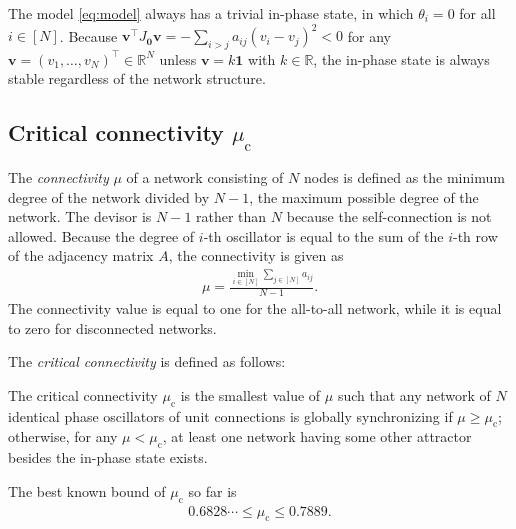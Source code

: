 The model \eqref{eq:model} always has a trivial in-phase state, in which $\theta_{i}=0$ for all $i\in[N]$. Because $\bm{v}^{\top}J_{\bm{0}}\bm{v}=-\sum_{i>j}a_{ij}(v_{i}-v_{j})^{2}<0$ for any $\bm{v}=(v_{1},\dots,v_{N})^{\top}\in\mathbb{R}^{N}$ unless $\bm{v}=k\bm{1}$ with $k\in\mathbb{R}$, the in-phase state is always stable regardless of the network structure.

\subsection{Critical connectivity $\mu_{\mathrm{c}}$}
The \textit{connectivity} $\mu$ of a network consisting of $N$ nodes is defined as the minimum degree of the network divided by $N-1$, the maximum possible degree of the network. The devisor is $N-1$ rather than $N$ because the self-connection is not allowed. Because the degree of $i$-th oscillator is equal to the sum of the $i$-th row of the adjacency matrix $A$, the connectivity is given as
\begin{align}
    \mu = \frac{\min_{i\in[N]}\sum_{j\in[N]}a_{ij}}{N-1}.
\end{align}
The connectivity value is equal to one for the all-to-all network, while it is equal to zero for disconnected networks.

The \textit{critical connectivity} is defined as follows:
\begin{define}
The critical connectivity $\mu_{\mathrm{c}}$ is the smallest value
of $\mu$ such that any network of $N$ identical phase oscillators of unit connections is globally synchronizing if $\mu\geq\mu_{\mathrm{c}}$;
otherwise, for any $\mu<\mu_{\mathrm{c}}$, at least one network having some other attractor besides the in-phase state exists.
\end{define}
The best known bound of $\mu_{\mathrm{c}}$ so far is
\begin{align}
    0.6828\cdots\leq\mu_{\mathrm{c}}\leq0.7889.
\end{align}


